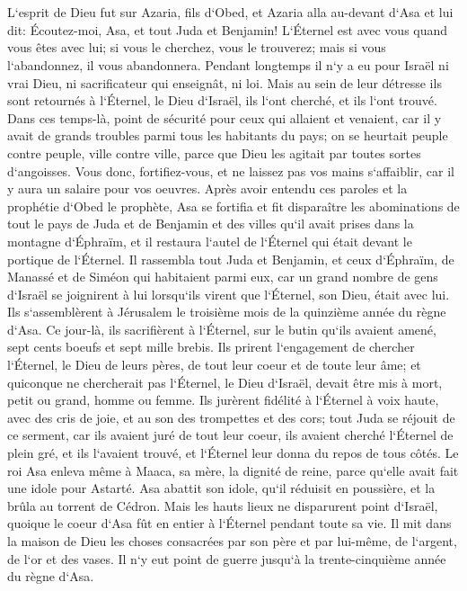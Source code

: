 \chapter{}

\verse L`esprit de Dieu fut sur Azaria, fils d`Obed, 
\verse et Azaria alla au-devant d`Asa et lui dit: Écoutez-moi, Asa, et tout Juda et Benjamin! L`Éternel est avec vous quand vous êtes avec lui; si vous le cherchez, vous le trouverez; mais si vous l`abandonnez, il vous abandonnera. 
\verse Pendant longtemps il n`y a eu pour Israël ni vrai Dieu, ni sacrificateur qui enseignât, ni loi. 
\verse Mais au sein de leur détresse ils sont retournés à l`Éternel, le Dieu d`Israël, ils l`ont cherché, et ils l`ont trouvé. 
\verse Dans ces temps-là, point de sécurité pour ceux qui allaient et venaient, car il y avait de grands troubles parmi tous les habitants du pays; 
\verse on se heurtait peuple contre peuple, ville contre ville, parce que Dieu les agitait par toutes sortes d`angoisses. 
\verse Vous donc, fortifiez-vous, et ne laissez pas vos mains s`affaiblir, car il y aura un salaire pour vos oeuvres. 
\verse Après avoir entendu ces paroles et la prophétie d`Obed le prophète, Asa se fortifia et fit disparaître les abominations de tout le pays de Juda et de Benjamin et des villes qu`il avait prises dans la montagne d`Éphraïm, et il restaura l`autel de l`Éternel qui était devant le portique de l`Éternel. 
\verse Il rassembla tout Juda et Benjamin, et ceux d`Éphraïm, de Manassé et de Siméon qui habitaient parmi eux, car un grand nombre de gens d`Israël se joignirent à lui lorsqu`ils virent que l`Éternel, son Dieu, était avec lui. 
\verse Ils s`assemblèrent à Jérusalem le troisième mois de la quinzième année du règne d`Asa. 
\verse Ce jour-là, ils sacrifièrent à l`Éternel, sur le butin qu`ils avaient amené, sept cents boeufs et sept mille brebis. 
\verse Ils prirent l`engagement de chercher l`Éternel, le Dieu de leurs pères, de tout leur coeur et de toute leur âme; 
\verse et quiconque ne chercherait pas l`Éternel, le Dieu d`Israël, devait être mis à mort, petit ou grand, homme ou femme. 
\verse Ils jurèrent fidélité à l`Éternel à voix haute, avec des cris de joie, et au son des trompettes et des cors; 
\verse tout Juda se réjouit de ce serment, car ils avaient juré de tout leur coeur, ils avaient cherché l`Éternel de plein gré, et ils l`avaient trouvé, et l`Éternel leur donna du repos de tous côtés. 
\verse Le roi Asa enleva même à Maaca, sa mère, la dignité de reine, parce qu`elle avait fait une idole pour Astarté. Asa abattit son idole, qu`il réduisit en poussière, et la brûla au torrent de Cédron. 
\verse Mais les hauts lieux ne disparurent point d`Israël, quoique le coeur d`Asa fût en entier à l`Éternel pendant toute sa vie. 
\verse Il mit dans la maison de Dieu les choses consacrées par son père et par lui-même, de l`argent, de l`or et des vases. 
\verse Il n`y eut point de guerre jusqu`à la trente-cinquième année du règne d`Asa. 

